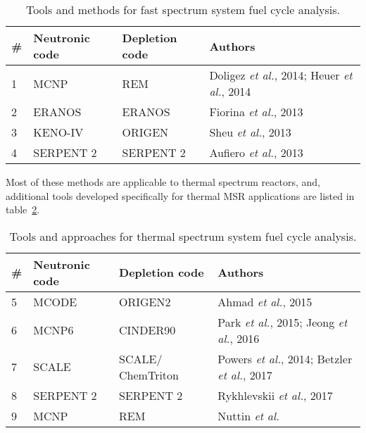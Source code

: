 \begin{table}[h!]
\centering
\caption{Tools and methods for fast spectrum system fuel cycle analysis.}
\begin{tabular}{ |m{}|m{}|m{}|m{}|} 
\hline
\# & Neutronic code  & Depletion code    & Authors         \\[5pt]
\hline
1 & \gls{MCNP} \cite{noauthor_mcnp_2004}      & REM \cite{heuer_simulation_2010}  & Doligez \emph{et al.}, 2014; Heuer \emph{et al.}, 2014 \cite{doligez_coupled_2014,heuer_towards_2014}    \\[5pt]
\hline
2 & ERANOS \cite{ruggieri_eranos_2006}      & ERANOS     & Fiorina \emph{et al.}, 2013 \cite{fiorina_investigation_2013}\\[5pt]
\hline
3 & KENO-IV \cite{goluoglu_monte_2011}     & ORIGEN \cite{gauld_isotopic_2011}     & Sheu \emph{et al.}, 2013 \cite{sheu_depletion_2013} \\[5pt]
\hline
4 & SERPENT 2 \cite{leppanen_serpent_2015}   & SERPENT 2  & Aufiero \emph{et al.}, 2013 \cite{aufiero_extended_2013} \\[5pt]
\hline
\end{tabular}
  \label{tab:fs_codes}
\end{table}

Most of these methods are applicable to thermal spectrum reactors, and, additional tools developed specifically for thermal \gls{MSR} applications are listed in table~\ref{tab:th_codes}.

\begin{table}[h!]
\centering
\caption{Tools and approaches for thermal spectrum system fuel cycle analysis.}
\begin{tabular}{ |m{}|m{}|m{}|m{}|} 
\hline
\# & Neutronic code  & Depletion code    & Authors         \\[5pt]
\hline
5 & MCODE \cite{xu_mcode_2008}      & ORIGEN2 \cite{croff_users_1980}      & Ahmad \emph{et al.}, 2015 \cite{ahmad_neutronics_2015}     \\[5pt]
\hline
6 & \gls{MCNP}6     & CINDER90 \cite{goorley_mcnp6_2013}     & Park \emph{et al.}, 2015; Jeong \emph{et al.}, 2016 \cite{park_whole_2015, jeong_equilibrium_2016}\\[5pt]
\hline
7 & SCALE \cite{bowman_scale_2011}      & SCALE/ ChemTriton \cite{powers_new_2013}    & Powers \emph{et al.}, 2014; Betzler \emph{et al.}, 2017 \cite{powers_new_2013,powers_inventory_2014,betzler_molten_2017}\\[5pt]
\hline
8 & SERPENT 2      & SERPENT 2     & Rykhlevskii \emph{et al.}, 2017 \cite{rykhlevskii_online_2017} \\[5pt]
\hline
9 & \gls{MCNP}      & REM  & Nuttin \emph{et al.} \cite{nuttin_potential_2005}    \\[5pt]
\hline
\end{tabular}
  \label{tab:th_codes}
\end{table}

